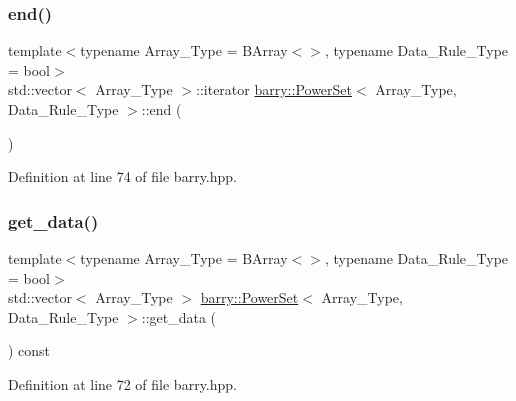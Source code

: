 \subsubsection{\texorpdfstring{end()}{end()}}
{\footnotesize\ttfamily template$<$typename Array\+\_\+\+Type  = B\+Array$<$$>$, typename Data\+\_\+\+Rule\+\_\+\+Type  = bool$>$ \\
std\+::vector$<$ Array\+\_\+\+Type $>$\+::iterator \hyperlink{classbarry_1_1_power_set}{barry\+::\+Power\+Set}$<$ Array\+\_\+\+Type, Data\+\_\+\+Rule\+\_\+\+Type $>$\+::end (\begin{DoxyParamCaption}{ }\end{DoxyParamCaption})\hspace{0.3cm}{\ttfamily [inline]}}



Definition at line 74 of file barry.\+hpp.

\mbox{\label{classbarry_1_1_power_set_a53ca37c9cb14abd6f61bc0127ac9d067}} 
\subsubsection{\texorpdfstring{get\+\_\+data()}{get\_data()}}
{\footnotesize\ttfamily template$<$typename Array\+\_\+\+Type  = B\+Array$<$$>$, typename Data\+\_\+\+Rule\+\_\+\+Type  = bool$>$ \\
std\+::vector$<$ Array\+\_\+\+Type $>$ \hyperlink{classbarry_1_1_power_set}{barry\+::\+Power\+Set}$<$ Array\+\_\+\+Type, Data\+\_\+\+Rule\+\_\+\+Type $>$\+::get\+\_\+data (\begin{DoxyParamCaption}{ }\end{DoxyParamCaption}) const\hspace{0.3cm}{\ttfamily [inline]}}



Definition at line 72 of file barry.\+hpp.

\mbox{\label{classbarry_1_1_power_set_a80b283b1ac115f1be049a09f1a69586a}} 
